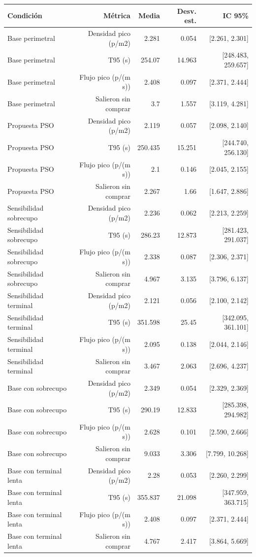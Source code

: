 \begin{tabular}{lrrrr}
\toprule
Condición & Métrica & Media & Desv. est. & IC 95\% \\
\midrule
Base perimetral & Densidad pico (p/m2) & 2.281 & 0.054 & [2.261, 2.301] \\
Base perimetral & T95 (s) & 254.07 & 14.963 & [248.483, 259.657] \\
Base perimetral & Flujo pico (p/(m s)) & 2.408 & 0.097 & [2.371, 2.444] \\
Base perimetral & Salieron sin comprar & 3.7 & 1.557 & [3.119, 4.281] \\
Propuesta PSO & Densidad pico (p/m2) & 2.119 & 0.057 & [2.098, 2.140] \\
Propuesta PSO & T95 (s) & 250.435 & 15.251 & [244.740, 256.130] \\
Propuesta PSO & Flujo pico (p/(m s)) & 2.1 & 0.146 & [2.045, 2.155] \\
Propuesta PSO & Salieron sin comprar & 2.267 & 1.66 & [1.647, 2.886] \\
Sensibilidad sobrecupo & Densidad pico (p/m2) & 2.236 & 0.062 & [2.213, 2.259] \\
Sensibilidad sobrecupo & T95 (s) & 286.23 & 12.873 & [281.423, 291.037] \\
Sensibilidad sobrecupo & Flujo pico (p/(m s)) & 2.338 & 0.087 & [2.306, 2.371] \\
Sensibilidad sobrecupo & Salieron sin comprar & 4.967 & 3.135 & [3.796, 6.137] \\
Sensibilidad terminal & Densidad pico (p/m2) & 2.121 & 0.056 & [2.100, 2.142] \\
Sensibilidad terminal & T95 (s) & 351.598 & 25.45 & [342.095, 361.101] \\
Sensibilidad terminal & Flujo pico (p/(m s)) & 2.095 & 0.138 & [2.044, 2.146] \\
Sensibilidad terminal & Salieron sin comprar & 3.467 & 2.063 & [2.696, 4.237] \\
Base con sobrecupo & Densidad pico (p/m2) & 2.349 & 0.054 & [2.329, 2.369] \\
Base con sobrecupo & T95 (s) & 290.19 & 12.833 & [285.398, 294.982] \\
Base con sobrecupo & Flujo pico (p/(m s)) & 2.628 & 0.101 & [2.590, 2.666] \\
Base con sobrecupo & Salieron sin comprar & 9.033 & 3.306 & [7.799, 10.268] \\
Base con terminal lenta & Densidad pico (p/m2) & 2.28 & 0.053 & [2.260, 2.299] \\
Base con terminal lenta & T95 (s) & 355.837 & 21.098 & [347.959, 363.715] \\
Base con terminal lenta & Flujo pico (p/(m s)) & 2.408 & 0.097 & [2.371, 2.444] \\
Base con terminal lenta & Salieron sin comprar & 4.767 & 2.417 & [3.864, 5.669] \\
\bottomrule
\end{tabular}
